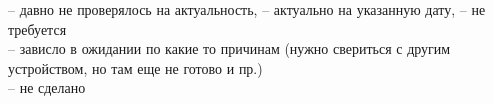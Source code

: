 \pagestyle{fancy}
\fancyhf{}
\renewcommand{\headrulewidth}{1pt}
\lhead{\color{black}{ЮТКБ.656122.609 РЭ6}}
\rfoot{{\thepage}}
\renewcommand{\footrulewidth}{1pt}


\pagecolor{yellow!5}

\begin{flushleft}

\color{black}

\footnotesize

{\color{olive}\large{\faQuestionCircle}} -- давно не проверялось на актуальность, {\color{teal}\large{\faPlusSquare}} -- актуально на указанную дату, {\color{cyan}\large{\faBan}} -- не требуется \\ {\color{orange}\large{\faSpinner}} -- зависло в ожидании по какие то причинам (нужно свериться с другим устройством, но там еще не готово и пр.) \\ {\color{red}\large{\faMinusSquare}} -- не сделано



\end{flushleft}
